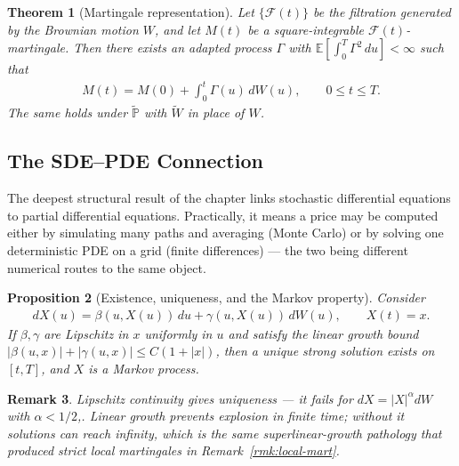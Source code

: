 \documentclass{report}
\theoremstyle{spacedplain}
\newtheorem{theorem}{Theorem}[section]
\newtheorem{proposition}[theorem]{Proposition}
\theoremstyle{spaceddefinition}
\theoremstyle{spacedremark}
\newtheorem{remark}[theorem]{Remark}
\begin{document}
\begin{theorem}[Martingale representation]
Let $\{\mathcal{F}(t)\}$ be the filtration generated by the Brownian motion $W$, and let $M(t)$ be a square-integrable $\mathcal{F}(t)$-martingale. Then there exists an adapted process $\Gamma$ with $\mathbb{E}\!\left[\int_0^T\Gamma^2\,du\right]<\infty$ such that
\begin{align}
    M(t) = M(0) + \int_0^t \Gamma(u)\, dW(u), \qquad 0\leq t\leq T.
\end{align}
The same holds under $\widetilde{\mathbb{P}}$ with $\widetilde{W}$ in place of $W$.
\end{theorem}


\subsection{The SDE--PDE Connection}

The deepest structural result of the chapter links stochastic differential equations to partial differential equations. Practically, it means a price may be computed either by simulating many paths and averaging (Monte Carlo) or by solving one deterministic PDE on a grid (finite differences) --- the two being different numerical routes to the same object.

\begin{proposition}[Existence, uniqueness, and the Markov property]
Consider
\begin{align}
    dX(u) = \beta(u, X(u))\, du + \gamma(u, X(u))\, dW(u), \qquad X(t) = x.
\end{align}
If $\beta,\gamma$ are Lipschitz in $x$ uniformly in $u$ and satisfy the linear growth bound $|\beta(u,x)| + |\gamma(u,x)| \leq C(1+|x|)$, then a unique strong solution exists on $[t,T]$, and $X$ is a Markov process.
\end{proposition}

\begin{remark}
Lipschitz continuity gives uniqueness --- it fails for $dX = |X|^{\alpha}dW$ with $\alpha<1/2$,. Linear growth prevents explosion in finite time; without it solutions can reach infinity, which is the same superlinear-growth pathology that produced strict local martingales in Remark~\ref{rmk:local-mart}.
\end{remark}
\end{document}
